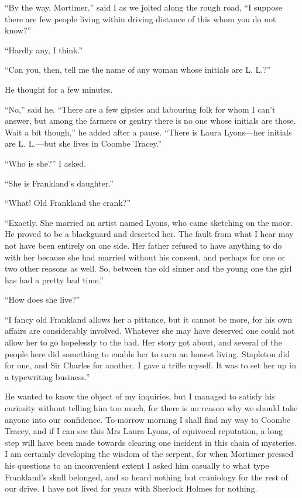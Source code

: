 \documentclass[paper=5.5in:8.5in,BCOR=7mm,twoside,DIV=calc,12pt,usegeometry,openany,chapterprefix,endperiod,headings=big]{scrbook} %
\begin{document}
\enquote{By the way, Mortimer,} said I as we jolted along the rough road, \enquote{I suppose there are few people living within driving distance of this whom you do not know?}

\enquote{Hardly any, I think.}

\enquote{Can you, then, tell me the name of any woman whose initials are L. L.?}

He thought for a few minutes.

\enquote{No,} said he. \enquote{There are a few gipsies and labouring folk for whom I can't answer, but among the farmers or gentry there is no one whose initials are those. Wait a bit though,} he added after a pause. \enquote{There is Laura Lyons---her initials are L. L.---but she lives in Coombe Tracey.}

\enquote{Who is she?} I asked.

\enquote{She is Frankland's daughter.}

\enquote{What! Old Frankland the crank?}

\enquote{Exactly. She married an artist named Lyons, who came sketching on the moor. He proved to be a blackguard and deserted her. The fault from what I hear may not have been entirely on one side. Her father refused to have anything to do with her because she had married without his consent, and perhaps for one or two other reasons as well. So, between the old sinner and the young one the girl has had a pretty bad time.}

\enquote{How does she live?}

\enquote{I fancy old Frankland allows her a pittance, but it cannot be more, for his own affairs are considerably involved. Whatever she may have deserved one could not allow her to go hopelessly to the bad. Her story got about, and several of the people here did something to enable her to earn an honest living. Stapleton did for one, and Sir Charles for another. I gave a trifle myself. It was to set her up in a typewriting business.}

He wanted to know the object of my inquiries, but I managed to satisfy his curiosity without telling him too much, for there is no reason why we should take anyone into our confidence. To-morrow morning I shall find my way to Coombe Tracey, and if I can see this Mrs Laura Lyons, of equivocal reputation, a long step will have been made towards clearing one incident in this chain of mysteries. I am certainly developing the wisdom of the serpent, for when Mortimer pressed his questions to an inconvenient extent I asked him casually to what type Frankland's skull belonged, and so heard nothing but craniology for the rest of our drive. I have not lived for years with Sherlock Holmes for nothing.
\end{document}
